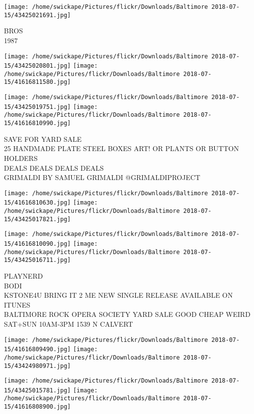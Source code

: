 \documentclass[10pt,letterpaper]{article}
\begin{document}
\vspace{0.25in}
\texttt{[image: /home/swickape/Pictures/flickr/Downloads/Baltimore 2018-07-15/43425021691.jpg]}

BROS\\
1987\\
\pagebreak

\texttt{[image: /home/swickape/Pictures/flickr/Downloads/Baltimore 2018-07-15/43425020801.jpg]}
\texttt{[image: /home/swickape/Pictures/flickr/Downloads/Baltimore 2018-07-15/41616811580.jpg]}

\texttt{[image: /home/swickape/Pictures/flickr/Downloads/Baltimore 2018-07-15/43425019751.jpg]}
\texttt{[image: /home/swickape/Pictures/flickr/Downloads/Baltimore 2018-07-15/41616810990.jpg]}

SAVE FOR YARD SALE\\
25 HANDMADE PLATE STEEL BOXES ART!  OR PLANTS OR BUTTON HOLDERS\\
DEALS DEALS DEALS DEALS\\
GRIMALDI BY SAMUEL GRIMALDI @GRIMALDIPROJECT\\
\pagebreak

\texttt{[image: /home/swickape/Pictures/flickr/Downloads/Baltimore 2018-07-15/41616810630.jpg]}
\texttt{[image: /home/swickape/Pictures/flickr/Downloads/Baltimore 2018-07-15/43425017821.jpg]}

\texttt{[image: /home/swickape/Pictures/flickr/Downloads/Baltimore 2018-07-15/41616810090.jpg]}
\texttt{[image: /home/swickape/Pictures/flickr/Downloads/Baltimore 2018-07-15/43425016711.jpg]}

PLAYNERD\\
BODI\\
KSTONE4U BRING IT 2 ME NEW SINGLE RELEASE AVAILABLE ON ITUNES\\
BALTIMORE ROCK OPERA SOCIETY YARD SALE GOOD CHEAP WEIRD SAT+SUN 10AM{-}3PM 1539 N CALVERT\\
\pagebreak

\texttt{[image: /home/swickape/Pictures/flickr/Downloads/Baltimore 2018-07-15/41616809490.jpg]}
\texttt{[image: /home/swickape/Pictures/flickr/Downloads/Baltimore 2018-07-15/43424980971.jpg]}

\texttt{[image: /home/swickape/Pictures/flickr/Downloads/Baltimore 2018-07-15/43425015781.jpg]}
\texttt{[image: /home/swickape/Pictures/flickr/Downloads/Baltimore 2018-07-15/41616808900.jpg]}
\end{document}
